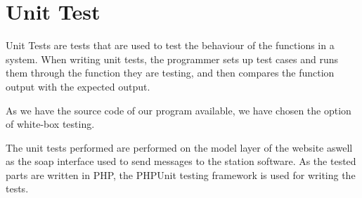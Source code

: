 \section{Unit Test}
Unit Tests are tests that are used to test the behaviour of the functions in a system.
When writing unit tests, the programmer sets up test cases and runs them through the function they are testing, and then compares the function output with the expected output.

As we have the source code of our program available, we have chosen the option of white-box testing.

The unit tests performed are performed on the model layer of the website aswell as the soap interface used to send messages to the station software.
As the tested parts are written in PHP, the PHPUnit testing framework is used for writing the tests. 